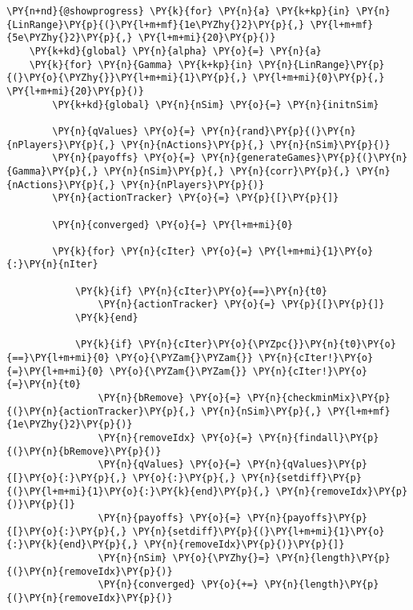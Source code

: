 \documentclass[main.tex]{subfiles}
\begin{document}
    \begin{tcolorbox}[breakable, size=fbox, boxrule=1pt, pad at break*=1mm,colback=cellbackground, colframe=cellborder]
\begin{Verbatim}[commandchars=\\\{\}]
\PY{n+nd}{@showprogress} \PY{k}{for} \PY{n}{a} \PY{k+kp}{in} \PY{n}{LinRange}\PY{p}{(}\PY{l+m+mf}{1e\PYZhy{}2}\PY{p}{,} \PY{l+m+mf}{5e\PYZhy{}2}\PY{p}{,} \PY{l+m+mi}{20}\PY{p}{)}
    \PY{k+kd}{global} \PY{n}{alpha} \PY{o}{=} \PY{n}{a}
    \PY{k}{for} \PY{n}{Gamma} \PY{k+kp}{in} \PY{n}{LinRange}\PY{p}{(}\PY{o}{\PYZhy{}}\PY{l+m+mi}{1}\PY{p}{,} \PY{l+m+mi}{0}\PY{p}{,} \PY{l+m+mi}{20}\PY{p}{)}
        \PY{k+kd}{global} \PY{n}{nSim} \PY{o}{=} \PY{n}{initnSim}
    
        \PY{n}{qValues} \PY{o}{=} \PY{n}{rand}\PY{p}{(}\PY{n}{nPlayers}\PY{p}{,} \PY{n}{nActions}\PY{p}{,} \PY{n}{nSim}\PY{p}{)}
        \PY{n}{payoffs} \PY{o}{=} \PY{n}{generateGames}\PY{p}{(}\PY{n}{Gamma}\PY{p}{,} \PY{n}{nSim}\PY{p}{,} \PY{n}{corr}\PY{p}{,} \PY{n}{nActions}\PY{p}{,} \PY{n}{nPlayers}\PY{p}{)}
        \PY{n}{actionTracker} \PY{o}{=} \PY{p}{[}\PY{p}{]}

        \PY{n}{converged} \PY{o}{=} \PY{l+m+mi}{0}

        \PY{k}{for} \PY{n}{cIter} \PY{o}{=} \PY{l+m+mi}{1}\PY{o}{:}\PY{n}{nIter}

            \PY{k}{if} \PY{n}{cIter}\PY{o}{==}\PY{n}{t0}
                \PY{n}{actionTracker} \PY{o}{=} \PY{p}{[}\PY{p}{]}
            \PY{k}{end}    

            \PY{k}{if} \PY{n}{cIter}\PY{o}{\PYZpc{}}\PY{n}{t0}\PY{o}{==}\PY{l+m+mi}{0} \PY{o}{\PYZam{}\PYZam{}} \PY{n}{cIter!}\PY{o}{=}\PY{l+m+mi}{0} \PY{o}{\PYZam{}\PYZam{}} \PY{n}{cIter!}\PY{o}{=}\PY{n}{t0}
                \PY{n}{bRemove} \PY{o}{=} \PY{n}{checkminMix}\PY{p}{(}\PY{n}{actionTracker}\PY{p}{,} \PY{n}{nSim}\PY{p}{,} \PY{l+m+mf}{1e\PYZhy{}2}\PY{p}{)}
                \PY{n}{removeIdx} \PY{o}{=} \PY{n}{findall}\PY{p}{(}\PY{n}{bRemove}\PY{p}{)}
                \PY{n}{qValues} \PY{o}{=} \PY{n}{qValues}\PY{p}{[}\PY{o}{:}\PY{p}{,} \PY{o}{:}\PY{p}{,} \PY{n}{setdiff}\PY{p}{(}\PY{l+m+mi}{1}\PY{o}{:}\PY{k}{end}\PY{p}{,} \PY{n}{removeIdx}\PY{p}{)}\PY{p}{]}
                \PY{n}{payoffs} \PY{o}{=} \PY{n}{payoffs}\PY{p}{[}\PY{o}{:}\PY{p}{,} \PY{n}{setdiff}\PY{p}{(}\PY{l+m+mi}{1}\PY{o}{:}\PY{k}{end}\PY{p}{,} \PY{n}{removeIdx}\PY{p}{)}\PY{p}{]}
                \PY{n}{nSim} \PY{o}{\PYZhy{}=} \PY{n}{length}\PY{p}{(}\PY{n}{removeIdx}\PY{p}{)}
                \PY{n}{converged} \PY{o}{+=} \PY{n}{length}\PY{p}{(}\PY{n}{removeIdx}\PY{p}{)}


\end{Verbatim}
\end{tcolorbox}
\end{document}
